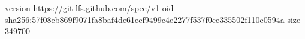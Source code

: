 version https://git-lfs.github.com/spec/v1
oid sha256:57f08eb869f9071fa8baf4de61ecf9499c4e2277f537f0ce335502f110e0594a
size 349700
